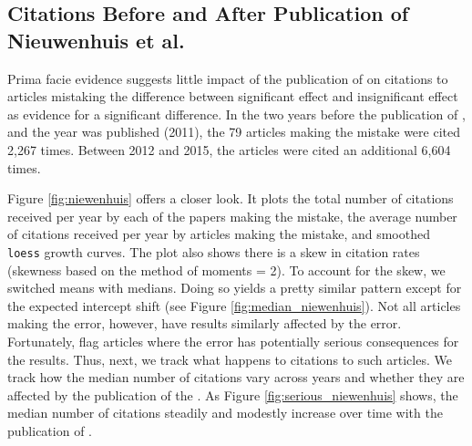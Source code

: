\documentclass[12pt, letterpaper]{article}
\begin{document}
\subsection{Citations Before and After Publication of Nieuwenhuis et al.}

Prima facie evidence suggests little impact of the publication of \citet{nieuwenhuis2011} on citations to articles mistaking the difference between significant effect and insignificant effect as evidence for a significant difference. In the two years before the publication of \citet{nieuwenhuis2011}, and the year \citet{nieuwenhuis2011} was published (2011), the 79 articles making the mistake were cited 2,267 times. Between 2012 and 2015, the articles were cited an additional 6,604 times.

Figure \ref{fig:niewenhuis} offers a closer look. It plots the total number of citations received per year by each of the papers making the mistake, the average number of citations received per year by articles making the mistake, and smoothed \texttt{loess} growth curves. The plot also shows there is a skew in citation rates (skewness based on the method of moments = 2). To account for the skew, we switched means with medians. Doing so yields a pretty similar pattern except for the expected intercept shift (see Figure \ref{fig:median_niewenhuis}). Not all articles making the error, however, have results similarly affected by the error. Fortunately, \citet{nieuwenhuis2011} flag articles where the error has potentially serious consequences for the results. Thus, next, we track what happens to citations to such articles. We track how the median number of citations vary across years and whether they are affected by the publication of the \citet{nieuwenhuis2011}. As Figure \ref{fig:serious_niewenhuis} shows, the median number of citations steadily and modestly increase over time with the publication of \citet{nieuwenhuis2011}.
\end{document}
